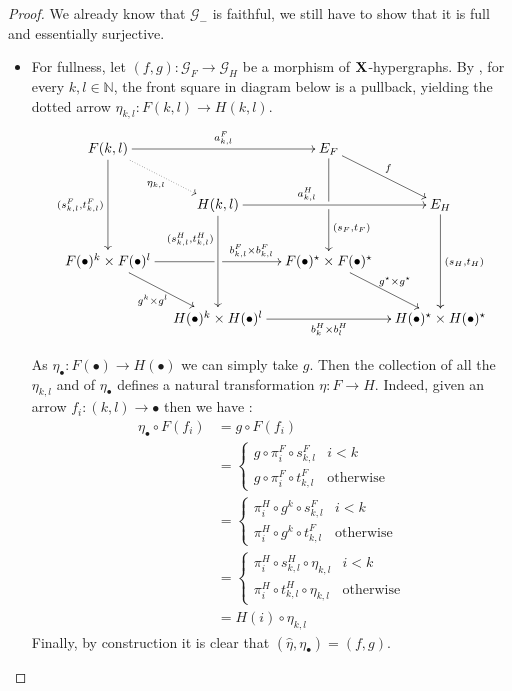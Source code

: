 \documentclass[runningheads,envcountsect]{lipics-v2021}
\def\X{\textbf {\textup{X}}}
\begin{document}
\iffalse 
\begin{proof}	
We already know that $\mathcal{G}_{-}$ is faithful, we still have to show that it is full and essentially surjective.
	\begin{itemize}
		\item For fullness, let $(f,g)\colon \mathcal{G}_F\to \mathcal{G}_{H}$ be a morphism of $\X$-hypergraphs. By , for every $k,l\in \mathbb{N}$, the front square in diagram below is a pullback, yielding the dotted arrow $\eta_{k,l}\colon F(k,l)\to H(k,l)$.
		\[\xymatrix@C=10pt{F(k,l)   \ar[dd]_{(s^F_{k,l}, t^F_{k,l})}\ar[rr]^-{a^F_{k,l}} \ar@{.>}[dr]_{\eta_{k,l }}&& E_F \ar[dd]|\hole^(.7){(s_F, t_F)}  \ar[dr]^{f}\\ & H(k,l) \ar[dd]_(.3){(s^H_{k,l}, t^H_{k,l})}\ar[rr]^(.4){a^H_{k,l}} &&  E_H \ar[dd]^{(s_H, t_H)}\\F(\bullet)^k\times F(\bullet)^l \ar[dr]_{g^k\times g^l} \ar[rr]|\hole^(.65){b^F_{k,l}\times b^F_{k,l}}& &F(\bullet)^\star \times F(\bullet)^\star  \ar[dr]^{g^\star\times g^\star}\\&H(\bullet)^k\times H(\bullet)^l \ar[rr]_{b^H_k\times b^H_l} && H(\bullet)^\star \times H(\bullet)^\star  }\]
		
		As $\eta_{\bullet}\colon F(\bullet)\to H(\bullet)$ we can simply take  $g$.  Then  the collection of all the $\eta_{k,l}$ and of $\eta_\bullet$ defines a natural transformation $\eta\colon F\to H$. Indeed, given an arrow $f_i\colon(k,l)\to \bullet$ then we have :	
		\begin{align*}
			\eta_\bullet \circ F(f_i)&=g\circ F(f_i)
			\\&= \begin{cases}
			g\circ \pi^F_i\circ s^F_{k,l} & i <k\\
			g\circ \pi^F_i\circ t^F_{k,l} & \text{otherwise}
			\end{cases}
			\\&=
			\begin{cases}
		\pi^H_i\circ g^k\circ s^F_{k,l} & i <k\\
		\pi^H_i\circ g^k\circ t^F_{k,l} 	& \text{otherwise}
			\end{cases}\\&=
		\begin{cases}
	\pi^H_i\circ s^H_{k,l} \circ \eta_{k,l}& i <k\\
	\pi^H_i\circ t^H_{k,l} \circ \eta_{k,l}	& \text{otherwise}
	\end{cases}\\&=H(i)\circ \eta_{k,l}
		\end{align*}
		Finally, by construction it is clear that $(\hat{\eta}, \eta_{\bullet})=(f,g)$. 
		

\end{itemize}
\end{proof}
\end{document}
